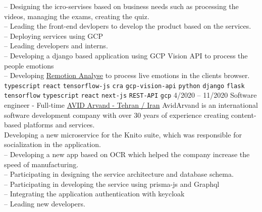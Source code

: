 \documentclass[9pt]{developercv}
\begin{document}
\begin{entrylist}
{		-- Designing the icro-servises based on business needs such as processing the videos, managing the exams, creating the quiz. \\
		-- Leading the front-end devlopers to develop the product based on the services. \\
		-- Deploying services using GCP \\
		-- Leading developers and interns. \\
		-- Developing a django based application using GCP Vision API to process the people emotions \\
		-- Developing \href{https://analyse.remotion.live/} {Remotion Analyse} to process live emotions in the clients browser. \\
		\texttt{typescript}\slashsep
		\texttt{react}\slashsep
		\texttt{tensorflow-js}\slashsep
		\texttt{cra}\slashsep
		\texttt{gcp-vision-api}\slashsep
		\texttt{python}\slashsep
		\texttt{django}\slashsep
		\texttt{flask}\slashsep
		\texttt{tensorflow}\slashsep
		\texttt{typescript}\slashsep
		\texttt{react}\slashsep
		\texttt{next-js}\slashsep
		\texttt{REST-API}\slashsep
		\texttt{gcp}\slashsep
	}
	\entry
	{4/2020 -- 11/2020}
	{Software engineer - Full-time}
	{
		\href{https://www.linkedin.com/company/avid-technology-development/}{AVID Arvand - Tehran / Iran}}
	{
		AvidArvand is an international software development company with over 30 years of experience creating content-based platforms and services. \\
		Developing a new microservice for the Knito suite, which was responsible for socialization in the application.\\
		-- Developing a new app based on OCR which helped
		the company increase the speed of manufacturing. \\
		-- Participating in designing the service architecture and database schema. \\
		-- Participating in developing the service using prisma-js and Graphql \\
		-- Integrating the application authentication with keycloak \\
		-- Leading new developers. \\
		
}
\end{entrylist}
\end{document}
